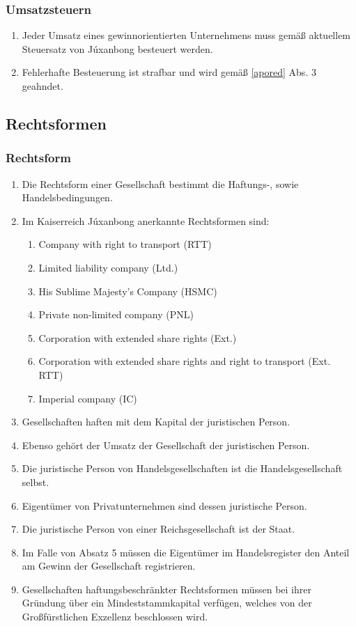 \documentclass{article}
\begin{document}
\subsubsection{Umsatzsteuern}
\begin{enumerate}[(1)]
    \item Jeder Umsatz eines gewinnorientierten Unternehmens muss gemäß aktuellem Steuersatz von Júxanbong besteuert werden.
    \item Fehlerhafte Besteuerung ist strafbar und wird gemäß \ref{apored} Abs. 3 geahndet.
\end{enumerate}

\subsection{Rechtsformen}
\subsubsection{Rechtsform} \label{gesellform}
\begin{enumerate}[(1)]
    \item Die Rechtsform einer Gesellschaft bestimmt die Haftungs-, sowie Handelsbedingungen.
    \item Im Kaiserreich Júxanbong anerkannte Rechtsformen sind:
        \begin{enumerate}[1.]
            \item Company with right to transport (RTT)
            \item Limited liability company (Ltd.)
            \item His Sublime Majesty's Company (HSMC)
            \item Private non-limited company (PNL)
            \item Corporation with extended share rights (Ext.)
            \item Corporation with extended share rights and right to transport (Ext. RTT)
            \item Imperial company (IC)
        \end{enumerate}
\item Gesellschaften haften mit dem Kapital der juristischen Person.
\item Ebenso gehört der Umsatz der Gesellschaft der juristischen Person.
\item Die juristische Person von Handelsgesellschaften ist die Handelsgesellschaft selbst.
\item Eigentümer von Privatunternehmen sind dessen juristische Person.
\item Die juristische Person von einer Reichsgesellschaft ist der Staat.
\item Im Falle von Absatz 5 müssen die Eigentümer im Handelsregister den Anteil am Gewinn der Gesellschaft registrieren.
\item Gesellschaften haftungsbeschränkter Rechtsformen müssen bei ihrer Gründung über ein Mindeststammkapital verfügen, welches von der Großfürstlichen Exzellenz beschlossen wird.
\end{enumerate}
\end{document}
